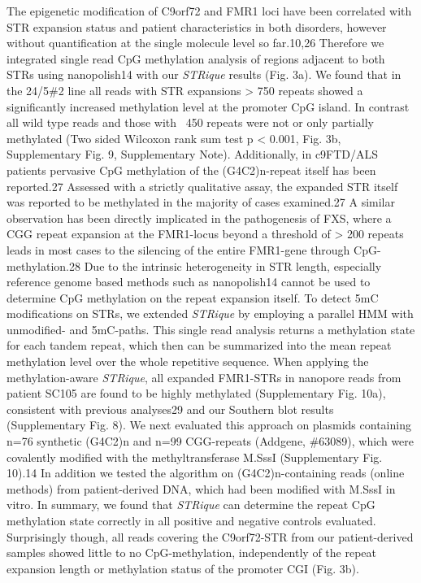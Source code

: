 The epigenetic modification of C9orf72 and FMR1 loci have been correlated with STR expansion status and patient characteristics in both disorders, however without quantification at the single molecule level so far.10,26 Therefore we integrated single read CpG methylation analysis of regions adjacent to both STRs using nanopolish14 with our \textit{STRique} results (Fig. 3a). We found that in the 24/5\#2 line all reads with STR expansions > 750 repeats showed a significantly increased methylation level at the promoter CpG island. In contrast all wild type reads and those with ~450 repeats were not or only partially methylated (Two sided Wilcoxon rank sum test p < 0.001, Fig. 3b, Supplementary Fig. 9, Supplementary Note).
Additionally, in c9FTD/ALS patients pervasive CpG methylation of the (G4C2)n-repeat itself has been reported.27 Assessed with a strictly qualitative assay, the expanded STR itself was reported to be methylated in the majority of cases examined.27 A similar observation has been directly implicated in the pathogenesis of FXS, where a CGG repeat expansion at the FMR1-locus beyond a threshold of > 200 repeats leads in most cases to the silencing of the entire FMR1-gene through CpG-methylation.28
Due to the intrinsic heterogeneity in STR length, especially reference genome based methods such as nanopolish14 cannot be used to determine CpG methylation on the repeat expansion itself. To detect 5mC modifications on STRs, we extended \textit{STRique} by employing a parallel HMM with unmodified- and 5mC-paths. This single read analysis returns a methylation state for each tandem repeat, which then can be summarized into the mean repeat methylation level over the whole repetitive sequence.
When applying the methylation-aware \textit{STRique}, all expanded FMR1-STRs in nanopore reads from patient SC105 are found to be highly methylated (Supplementary Fig. 10a), consistent with previous analyses29 and our Southern blot results (Supplementary Fig. 8). We next evaluated this approach on plasmids containing n=76 synthetic (G4C2)n and n=99 CGG-repeats (Addgene, \#63089), which were covalently modified with the methyltransferase M.SssI (Supplementary Fig. 10).14 In addition we tested the algorithm on (G4C2)n-containing reads (online methods) from patient-derived DNA, which had been modified with M.SssI in vitro. In summary, we found that \textit{STRique} can determine the repeat CpG methylation state correctly in all positive and negative controls evaluated.
Surprisingly though, all reads covering the C9orf72-STR from our patient-derived samples showed little to no CpG-methylation, independently of the repeat expansion length or methylation status of the promoter CGI (Fig. 3b).


